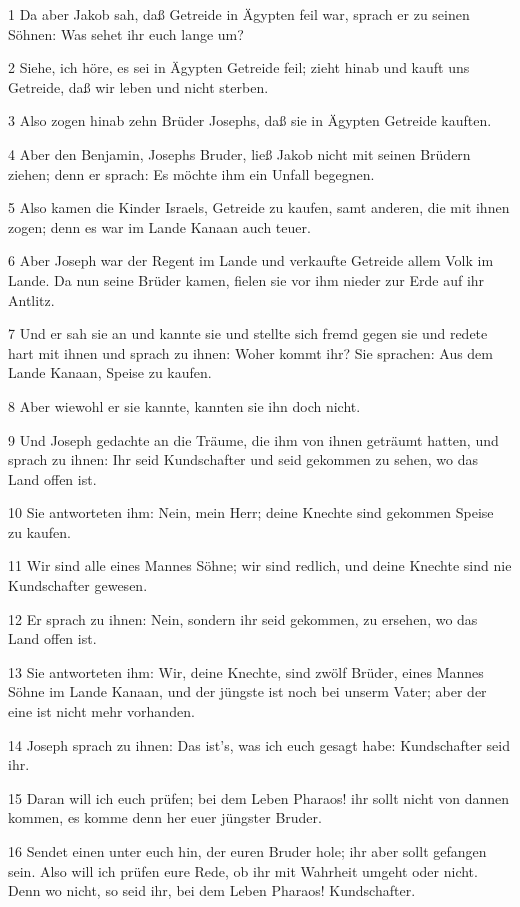 \par 1 Da aber Jakob sah, daß Getreide in Ägypten feil war, sprach er zu seinen Söhnen: Was sehet ihr euch lange um?
\par 2 Siehe, ich höre, es sei in Ägypten Getreide feil; zieht hinab und kauft uns Getreide, daß wir leben und nicht sterben.
\par 3 Also zogen hinab zehn Brüder Josephs, daß sie in Ägypten Getreide kauften.
\par 4 Aber den Benjamin, Josephs Bruder, ließ Jakob nicht mit seinen Brüdern ziehen; denn er sprach: Es möchte ihm ein Unfall begegnen.
\par 5 Also kamen die Kinder Israels, Getreide zu kaufen, samt anderen, die mit ihnen zogen; denn es war im Lande Kanaan auch teuer.
\par 6 Aber Joseph war der Regent im Lande und verkaufte Getreide allem Volk im Lande. Da nun seine Brüder kamen, fielen sie vor ihm nieder zur Erde auf ihr Antlitz.
\par 7 Und er sah sie an und kannte sie und stellte sich fremd gegen sie und redete hart mit ihnen und sprach zu ihnen: Woher kommt ihr? Sie sprachen: Aus dem Lande Kanaan, Speise zu kaufen.
\par 8 Aber wiewohl er sie kannte, kannten sie ihn doch nicht.
\par 9 Und Joseph gedachte an die Träume, die ihm von ihnen geträumt hatten, und sprach zu ihnen: Ihr seid Kundschafter und seid gekommen zu sehen, wo das Land offen ist.
\par 10 Sie antworteten ihm: Nein, mein Herr; deine Knechte sind gekommen Speise zu kaufen.
\par 11 Wir sind alle eines Mannes Söhne; wir sind redlich, und deine Knechte sind nie Kundschafter gewesen.
\par 12 Er sprach zu ihnen: Nein, sondern ihr seid gekommen, zu ersehen, wo das Land offen ist.
\par 13 Sie antworteten ihm: Wir, deine Knechte, sind zwölf Brüder, eines Mannes Söhne im Lande Kanaan, und der jüngste ist noch bei unserm Vater; aber der eine ist nicht mehr vorhanden.
\par 14 Joseph sprach zu ihnen: Das ist's, was ich euch gesagt habe: Kundschafter seid ihr.
\par 15 Daran will ich euch prüfen; bei dem Leben Pharaos! ihr sollt nicht von dannen kommen, es komme denn her euer jüngster Bruder.
\par 16 Sendet einen unter euch hin, der euren Bruder hole; ihr aber sollt gefangen sein. Also will ich prüfen eure Rede, ob ihr mit Wahrheit umgeht oder nicht. Denn wo nicht, so seid ihr, bei dem Leben Pharaos! Kundschafter.
